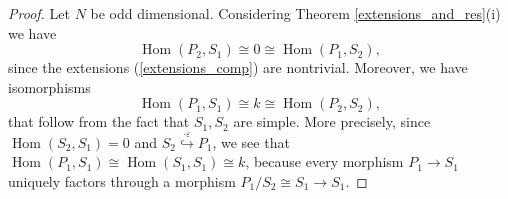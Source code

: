 \documentclass[a4paper, twoside, 11pt]{amsart}
\theoremstyle{definition}
\theoremstyle{remark}
\numberwithin{equation}{theorem}
\DeclareMathOperator{\Hom}{Hom}
\begin{document}
\begin{proof}
    Let $N$ be odd dimensional. Considering Theorem \ref{extensions_and_res}(i) we have 
    \begin{equation*}
        \Hom(P_2, S_1) \cong 0 \cong \Hom(P_1, S_2),
    \end{equation*}
    since the extensions (\ref{extensions_comp}) are nontrivial. Moreover, we have isomorphisms
    \begin{equation*}
         \Hom(P_1, S_1) \cong k \cong \Hom(P_2, S_2),
    \end{equation*}
    that follow from the fact that $S_1, S_2$ are simple. More precisely, since $\Hom(S_2,S_1) =0$ and $S_2 \overset{\cdot \varepsilon}{\hookrightarrow} P_1$, we see that $\Hom(P_1, S_1) \cong \Hom(S_1, S_1) \cong k$, because every morphism $P_1 \to S_1$ uniquely factors through a morphism $P_1/S_2\cong S_1 \to S_1$.
    

\end{proof}
\end{document}
